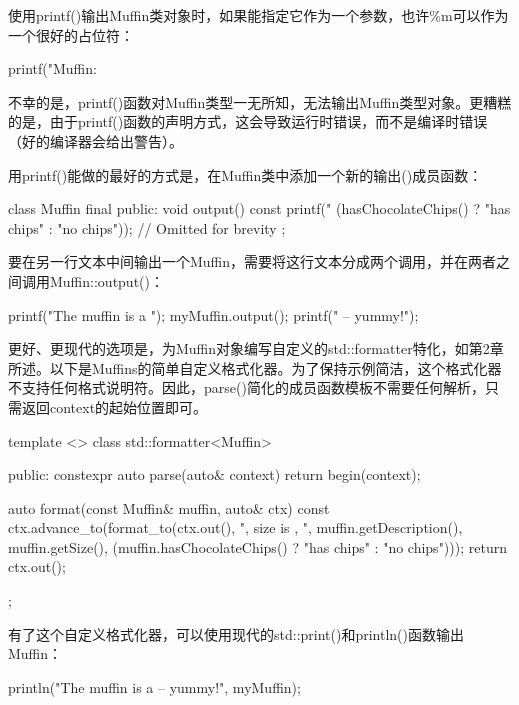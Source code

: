 使用printf()输出Muffin类对象时，如果能指定它作为一个参数，也许\%m可以作为一个很好的占位符：

\begin{cpp}
printf("Muffin: %
\end{cpp}

不幸的是，printf()函数对Muffin类型一无所知，无法输出Muffin类型对象。更糟糕的是，由于printf()函数的声明方式，这会导致运行时错误，而不是编译时错误（好的编译器会给出警告）。

用printf()能做的最好的方式是，在Muffin类中添加一个新的输出()成员函数：

\begin{cpp}
class Muffin final
{
    public:
    void output() const
    {
        printf("%
            (hasChocolateChips() ? "has chips" : "no chips"));
    }
    // Omitted for brevity
};
\end{cpp}

要在另一行文本中间输出一个Muffin，需要将这行文本分成两个调用，并在两者之间调用Muffin::output()：

\begin{cpp}
printf("The muffin is a ");
myMuffin.output();
printf(" -- yummy!\n");
\end{cpp}

更好、更现代的选项是，为Muffin对象编写自定义的std::formatter特化，如第2章所述。以下是Muffins的简单自定义格式化器。为了保持示例简洁，这个格式化器不支持任何格式说明符。因此，parse()简化的成员函数模板不需要任何解析，只需返回context的起始位置即可。

\begin{cpp}
template <>
class std::formatter<Muffin>
{
    public:
    constexpr auto parse(auto& context) { return begin(context); }

    auto format(const Muffin& muffin, auto& ctx) const
    {
        ctx.advance_to(format_to(ctx.out(), "{}, size is {}, {}",
            muffin.getDescription(), muffin.getSize(),
            (muffin.hasChocolateChips() ? "has chips" : "no chips")));
        return ctx.out();
    }
};
\end{cpp}

有了这个自定义格式化器，可以使用现代的std::print()和println()函数输出Muffin：

\begin{cpp}
println("The muffin is a {} -- yummy!", myMuffin);
\end{cpp}

